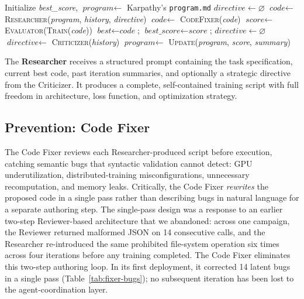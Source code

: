 \documentclass[conference]{IEEEtran}
\begin{document}
\begin{algorithm}[tbp]
\caption{Three-agent AutoResearch loop (System~A)}
\label{alg:loop}
\begin{algorithmic}[1]
\State Initialize \textit{best\_score}, $\textit{program} \gets$ Karpathy's \texttt{program.md}
\State $\textit{directive} \gets \varnothing$
  \State $\textit{code} \gets$ \textsc{Researcher}(\textit{program}, \textit{history}, \textit{directive})
  \State $\textit{code} \gets$ \textsc{CodeFixer}(\textit{code}) 
  \State $\textit{score} \gets$ \textsc{Evaluator}(\textsc{Train}(\textit{code}))
    \State $\textit{best} \gets \textit{code}$; $\textit{best\_score} \gets \textit{score}$;
    \State $\textit{directive} \gets \varnothing$
  \EndIf
    \State $\textit{directive} \gets$ \textsc{Criticizer}(\textit{history})
  \EndIf
  \State $\textit{program} \gets$ \textsc{Update}(\textit{program}, \textit{score}, \textit{summary})
\EndFor
\end{algorithmic}
\end{algorithm}

The \textbf{Researcher} receives a structured prompt containing the task specification, current best code, past iteration summaries, and optionally a strategic directive from the Criticizer. It produces a complete, self-contained training script with full freedom in architecture, loss function, and optimization strategy.

\subsection{Prevention: Code Fixer}

The Code Fixer reviews each Researcher-produced script before execution, catching semantic bugs that syntactic validation cannot detect: GPU underutilization, distributed-training misconfigurations, unnecessary recomputation, and memory leaks. Critically, the Code Fixer \textit{rewrites} the proposed code in a single pass rather than describing bugs in natural language for a separate authoring step. The single-pass design was a response to an earlier two-step Reviewer-based architecture that we abandoned: across one campaign, the Reviewer returned malformed JSON on 14 consecutive calls, and the Researcher re-introduced the same prohibited file-system operation six times across four iterations before any training completed. The Code Fixer eliminates this two-step authoring loop. In its first deployment, it corrected 14 latent bugs in a single pass (Table~\ref{tab:fixer-bugs}); no subsequent iteration has been lost to the agent-coordination layer.
\end{document}
